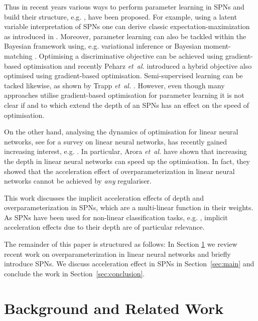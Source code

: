 \documentclass{article}
\begin{document}
Thus in recent years various ways to perform parameter learning in SPNs and build their structure, e.g. \cite{Gens2013,Vergari2015}, have been proposed.
For example, using a latent variable interpretation of SPNs \cite{Poon2011a,Peharz2017} one can derive classic expectation-maximization as introduced in \cite{Peharz2017}.
Moreover, parameter learning can also be tackled within the Bayesian framework using, e.g. variational inference \cite{Zhao2016} or Bayesian moment-matching \cite{Rashwan2016}.
Optimising a discriminative objective can be achieved using gradient-based optimisation \cite{Gens2012} and recently Peharz {\it et~al.} \cite{Peharz2018} introduced a hybrid objective also optimised using gradient-based optimisation.
Semi-supervised learning can be tacked likewise, as shown by Trapp {\it et~al.} \cite{Trapp2017}.
However, even though many approaches utilise gradient-based optimisation for parameter learning it is not clear if and to which extend the depth of an SPNs has an effect on the speed of optimisation.

On the other hand, analysing the dynamics of optimisation for linear neural networks, see \cite{Baldi1995} for a survey on linear neural networks, has recently gained increasing interest, e.g. \cite{Saxe2014,Arora2018}.
In particular, Arora {\it et~al.} \cite{Arora2018} have shown that increasing the depth in linear neural networks can speed up the optimisation. In fact, they showed that the acceleration effect of overparameterization in linear neural networks cannot be achieved by \emph{any} regulariser.

This work discusses the implicit acceleration effects of depth and overparameterization in SPNs, which are a multi-linear function in their weights. As SPNs have been used for non-linear classification tasks, e.g. \cite{Gens2012,Trapp2017,Peharz2018}, implicit acceleration effects due to their depth are of particular relevance.

The remainder of this paper is structured as follows:
In Section \ref{sec:background} we review recent work on overparameterization in linear neural networks and briefly introduce SPNs.
We discuss acceleration effect in SPNs in Section~\ref{sec:main} and conclude the work in Section~\ref{sec:conclusion}.

\section{Background and Related Work} \label{sec:background}
\end{document}
